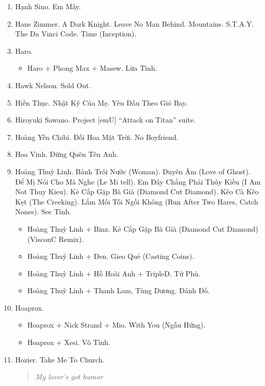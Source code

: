 \documentclass{article}
\begin{document}
\begin{enumerate}
\begin{quotation}
		Well, \textbf{my heart is gold} \& \textbf{my hands are cold}\hfill$\square$
	\end{quotation}
	\item {\sc Hạnh Sino.} Em Mây.
	\item {\sc Hans Zimmer.} A Dark Knight. Leave No Man Behind. Mountains. S.T.A.Y. The Da Vinci Code. Time (Inception).
	\item {\sc Haro.}
	\begin{itemize}
		\item {\sc Haro $+$ Phong Max $+$ Masew.} Lừa Tình.
	\end{itemize}
	\item {\sc Hawk Nelson.} Sold Out.
	\item {\sc Hiền Thục.} Nhật Ký Của Mẹ. Yêu Dấu Theo Gió Bay.
	\item {\sc Hiroyuki Sawano.} Project [emU] ``Attack on Titan'' suite.
	\item {\sc Hoàng Yến Chibi.} Đồi Hoa Mặt Trời. No Boyfriend.
	\item {\sc Hoa Vinh.} Đừng Quên Tên Anh.
	\item {\sc Hoàng Thuỳ Linh.} Bánh Trôi Nước (Woman). Duyên Âm (Love of Ghost). Để Mị Nói Cho Mà Nghe (Le Mi tell). Em Đây Chẳng Phải Thúy Kiều (I Am Not Thuy Kieu). Kẻ Cắp Gặp Bà Già (Diamond Cut Diamond). Kẽo Cà Kẽo Kẹt (The Creeking). Lắm Mối Tối Ngồi Không (Run After Two Hares, Catch Nones). See Tình.
	\begin{itemize}
		\item {\sc Hoàng Thuỳ Linh $+$ Binz.} Kẻ Cắp Gặp Bà Già (Diamond Cut Diamond) (VisconC Remix).
		\item {\sc Hoàng Thuỳ Linh $+$ Đen.} Gieo Quẻ (Casting Coins).
		\item {\sc Hoàng Thuỳ Linh $+$ Hồ Hoài Anh $+$ TripleD.} Tứ Phủ.
		\item {\sc Hoàng Thuỳ Linh $+$ Thanh Lam, Tùng Dương.} Đánh Đố.
	\end{itemize}
	\item {\sc Hoaprox.}
	\begin{itemize}
		\item {\sc Hoaprox $+$ Nick Strand $+$ Mio.} With You (Ngẫu Hứng).
		\item {\sc Hoaprox $+$ Xesi.} Vô Tình.
	\end{itemize}
	\item {\sc Hozier.} Take Me To Church.

	\begin{quotation}\it
		My lover's got humor


\end{quotation}
\end{enumerate}
\end{document}
